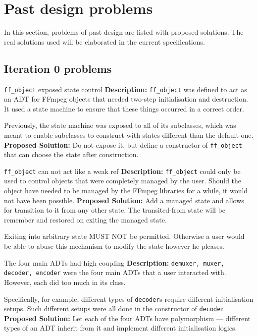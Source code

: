 \section{Past design problems}
In this section, problems of past design are listed with proposed solutions. The real solutions used will be elaborated in the current specifications.

\subsection{Iteration 0 problems}
\begin{designproblembox}{\texttt{ff\_object} exposed state control}
	\textbf{Description:} \texttt{ff\_object} was defined to act as an ADT for FFmpeg objects that needed two-step initialisation and destruction. It used a state machine to ensure that these things occurred in a correct order.
	
	Previously, the state machine was exposed to all of its subclasses, which was meant to enable subclasses to construct with states different than the default one.
\tcblower
	\textbf{Proposed Solution:} Do not expose it, but define a constructor of \texttt{ff\_object} that can choose the state after construction.
\end{designproblembox}

\begin{designproblembox}{\texttt{ff\_object} can not act like a weak ref}
	\textbf{Description:}  \texttt{ff\_object} could only be used to control objects that were completely managed by the user. Should the object have needed to be managed by the FFmpeg libraries for a while, it would not have been possible.
\tcblower
	\textbf{Proposed Solution:} Add a managed state and allows for transition to it from any other state. The transited-from state will be remember and restored on exiting the managed state.
	
	Exiting into arbitrary state MUST NOT be permitted. Otherwise a user would be able to abuse this mechanism to modify the state however he pleases.
\end{designproblembox}

\begin{designproblembox}{The four main ADTs had high coupling}
	\textbf{Description:}  \texttt{demuxer, muxer, decoder, encoder} were the four main ADTs that a user interacted with. However, each did too much in its class. 
	
	Specifically, for example, different types of \texttt{decoder}s require different initialisation setups.
	Such different setups were all done in the constructor of \texttt{decoder}.
\tcblower
	\textbf{Proposed Solution:} Let each of the four ADTs have polymorphism --- different types of an ADT inherit from it and implement different initialisation logics.
\end{designproblembox}